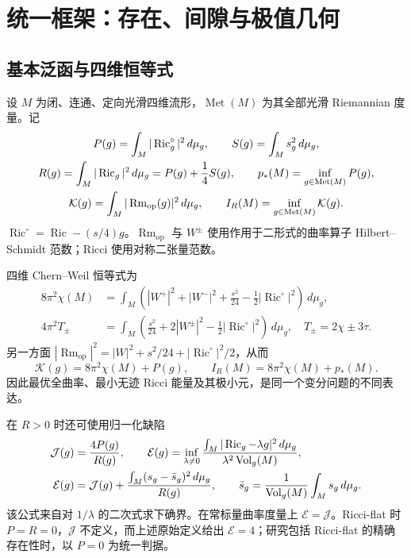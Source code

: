 \documentclass[11pt,a4paper]{article}
\newcommand{\Ric}{\operatorname{Ric}}
\newcommand{\Rm}{\operatorname{Rm}}
\newcommand{\Met}{\operatorname{Met}}
\newcommand{\Vol}{\operatorname{Vol}}
\newcommand{\dd}{\,d\mu_g}
\theoremstyle{definition}
\numberwithin{equation}{section}
\begin{document}
\newpage
\section{统一框架：存在、间隙与极值几何}

\subsection{基本泛函与四维恒等式}
设 $M$ 为闭、连通、定向光滑四维流形，$\Met(M)$ 为其全部光滑 Riemannian 度量。记
\begin{gather}
 P(g)=\int_M|\Ric_g^\circ|^2\dd,\qquad
 S(g)=\int_Ms_g^2\dd,\notag\\
 R(g)=\int_M|\Ric_g|^2\dd=P(g)+\frac14S(g),\qquad
 p_*(M)=\inf_{g\in\Met(M)}P(g),\label{eq:energies}\\
 \mathcal K(g)=\int_M|\Rm_{\mathrm{op}}(g)|^2\dd,\qquad
 I_R(M)=\inf_{g\in\Met(M)}\mathcal K(g).\notag
\end{gather}
$\Ric^\circ=\Ric-(s/4)g$。$\Rm_{\mathrm{op}}$ 与 $W^\pm$ 使用作用于二形式的曲率算子 Hilbert--Schmidt 范数；Ricci 使用对称二张量范数。

四维 Chern--Weil 恒等式为
\begin{align}
8\pi^2\chi(M)&=\int_M\left(|W^+|^2+|W^-|^2+\frac{s^2}{24}-\frac12|\Ric^\circ|^2\right)\dd,\label{eq:GB}\\
4\pi^2T_\pm&=\int_M\left(\frac{s^2}{24}+2|W^\pm|^2-\frac12|\Ric^\circ|^2\right)\dd,
\quad T_\pm=2\chi\pm3\tau.\label{eq:CW}
\end{align}
另一方面 $|\Rm_{\mathrm{op}}|^2=|W|^2+s^2/24+|\Ric^\circ|^2/2$，从而
\begin{equation}
\boxed{\mathcal K(g)=8\pi^2\chi(M)+P(g),\qquad
I_R(M)=8\pi^2\chi(M)+p_*(M).}\label{eq:fullP}
\end{equation}
因此最优全曲率、最小无迹 Ricci 能量及其极小元，是同一个变分问题的不同表达。

在 $R>0$ 时还可使用归一化缺陷
\begin{align}
\mathcal J(g)&=\frac{4P(g)}{R(g)},\qquad
\mathcal E(g)=\inf_{\lambda\ne0}
\frac{\int_M|\Ric_g-\lambda g|^2\dd}{\lambda^2\Vol_g(M)},\notag\\
\mathcal E(g)&=\mathcal J(g)+
\frac{\int_M(s_g-\bar s_g)^2\dd}{R(g)},\qquad
\bar s_g=\frac1{\Vol_g(M)}\int_Ms_g\dd.\label{eq:normalized}
\end{align}
该公式来自对 $1/\lambda$ 的二次式求下确界。在常标量曲率度量上 $\mathcal E=\mathcal J$。Ricci-flat 时 $P=R=0$，$\mathcal J$ 不定义，而上述原始定义给出 $\mathcal E=4$；研究包括 Ricci-flat 的精确存在性时，以 $P=0$ 为统一判据。
\end{document}
